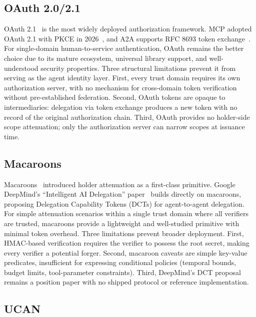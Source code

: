 \documentclass[11pt,a4paper]{article}
\newcommand{\atoa}{\textsc{A2A}}
\newcommand{\mcp}{\textsc{MCP}}
\begin{document}
\subsection{OAuth 2.0/2.1}
\label{sec:oauth}

OAuth 2.1~\citep{ietf2024oauth21} is the most widely deployed authorization framework. \mcp{} adopted OAuth 2.1 with PKCE in 2026~\citep{anthropic2024mcp}, and \atoa{} supports RFC 8693 token exchange~\citep{google2025a2a}. For single-domain human-to-service authentication, OAuth remains the better choice due to its mature ecosystem, universal library support, and well-understood security properties. Three structural limitations prevent it from serving as the agent identity layer. First, every trust domain requires its own authorization server, with no mechanism for cross-domain token verification without pre-established federation. Second, OAuth tokens are opaque to intermediaries: delegation via token exchange produces a new token with no record of the original authorization chain. Third, OAuth provides no holder-side scope attenuation; only the authorization server can narrow scopes at issuance time.

\subsection{Macaroons}
\label{sec:macaroons}

Macaroons~\citep{birgisson2014macaroons} introduced holder attenuation as a first-class primitive. Google DeepMind's ``Intelligent AI Delegation'' paper~\citep{deepmind2026delegation} builds directly on macaroons, proposing Delegation Capability Tokens (DCTs) for agent-to-agent delegation. For simple attenuation scenarios within a single trust domain where all verifiers are trusted, macaroons provide a lightweight and well-studied primitive with minimal token overhead. Three limitations prevent broader deployment. First, HMAC-based verification requires the verifier to possess the root secret, making every verifier a potential forger. Second, macaroon caveats are simple key-value predicates, insufficient for expressing conditional policies (temporal bounds, budget limits, tool-parameter constraints). Third, DeepMind's DCT proposal remains a position paper with no shipped protocol or reference implementation.

\subsection{UCAN}
\label{sec:ucan}
\end{document}
